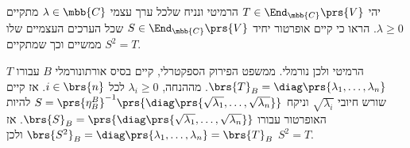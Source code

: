 \documentclass[a4paper,10pt,twoside,openany]{book}
\begin{document}
\begin{exercisechap}
יהי
$T \in \End_{\mbb{C}}\prs{V}$
הרמיטי ונניח שלכל ערך עצמי
$\lambda \in \mbb{C}$
מתקיים
$\lambda \geq 0$.
הראו כי קיים אופרטור יחיד
$S \in \End_{\mbb{C}}\prs{V}$
שכל הערכים העצמיים שלו ממשיים וכך שמתקיים
$S^2 = T$.
\end{exercisechap}

\begin{solution}
$T$
הרמיטי ולכן נורמלי. ממשפט הפירוק הספקטרלי, קיים בסיס אורתונורמלי
$B$
עבורו
$\brs{T}_B = \diag\prs{\lambda_1, \ldots, \lambda_n}$.
מההנחה,
$\lambda_i \geq 0$
לכל
$i \in \brs{n}$.
אז קיים שורש חיובי
$\sqrt{\lambda_i}$
וניקח
$S = \prs{\eta^B_B}^{-1} \prs{\diag\prs{\sqrt{\lambda_1}, \ldots, \sqrt{\lambda_n}}}$
להיות האופרטור עבורו
$\brs{S}_B = \prs{\diag\prs{\sqrt{\lambda_1}, \ldots, \sqrt{\lambda_n}}}$.
אז
$\brs{S^2}_B = \diag\prs{\lambda_1, \ldots, \lambda_n} = \brs{T}_B$
ולכן
$S^2 = T$.
\end{solution}
\end{document}
